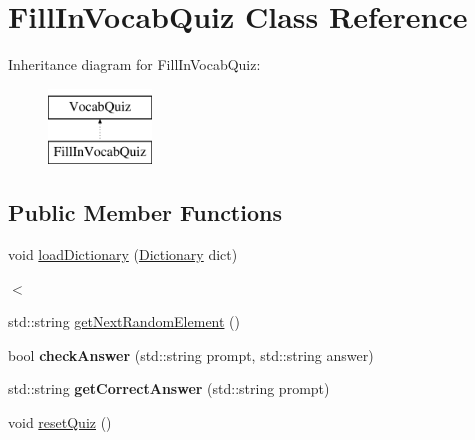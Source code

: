 \hypertarget{classFillInVocabQuiz}{
\section{FillInVocabQuiz Class Reference}
\label{classFillInVocabQuiz}
}
Inheritance diagram for FillInVocabQuiz:\begin{figure}[H]
\begin{center}
\leavevmode
\includegraphics[height=2cm]{classFillInVocabQuiz}
\end{center}
\end{figure}
\subsection*{Public Member Functions}
\begin{DoxyCompactItemize}
\item 
void \hyperlink{classFillInVocabQuiz_affe1c2da58f58e96643a5d95bf3a6e47}{loadDictionary} (\hyperlink{classDictionary}{Dictionary} dict)
\begin{DoxyCompactList}\small\item\em $<$ \item\end{DoxyCompactList}\item 
std::string \hyperlink{classFillInVocabQuiz_a551b818f3b29e9c72e44cc9c0ba1c4cb}{getNextRandomElement} ()
\item 
\hypertarget{classFillInVocabQuiz_affa224bc65f24fcff35595047f44efb9}{
bool {\bfseries checkAnswer} (std::string prompt, std::string answer)}
\label{classFillInVocabQuiz_affa224bc65f24fcff35595047f44efb9}

\item 
\hypertarget{classFillInVocabQuiz_a66e8a1cf944ed67e2adc8cdae22919b5}{
std::string {\bfseries getCorrectAnswer} (std::string prompt)}
\label{classFillInVocabQuiz_a66e8a1cf944ed67e2adc8cdae22919b5}

\item 
void \hyperlink{classFillInVocabQuiz_af0042ea53197503e5a5a6f25dcece8fd}{resetQuiz} ()
\end{DoxyCompactItemize}



